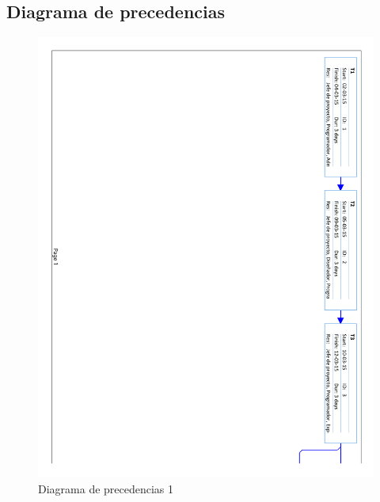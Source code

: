 \subsection{Diagrama de precedencias}

\begin{figure}[!htbp]
	\centering
	\includegraphics[page=1, scale=.65]{fig/network_diagram}
	\caption{Diagrama de precedencias 1}
\end{figure}

